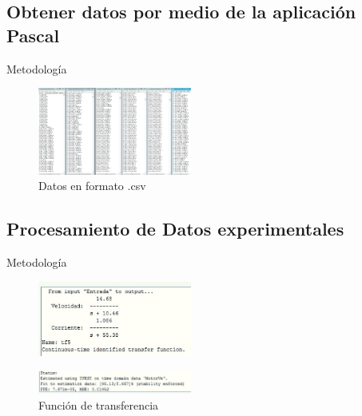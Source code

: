 \documentclass[mathserif,spanish]{beamer}
\begin{document}
    \subsection{Obtener datos por medio de la aplicación Pascal}
        \begin{frame}{Metodología}
              \item 
                 
        \begin{figure}[!h]
\centering
\includegraphics[width=0.45\textwidth]{Img04.png}
\caption{Datos en formato .csv}
\label{fig:rlocus1}
\end{figure}
        
      \end{frame}


    \subsection{Procesamiento de Datos experimentales}
        \begin{frame}{Metodología}
             \item 
                 
        \begin{figure}[!h]
\centering
\includegraphics[width=0.45\textwidth]{img02.jpeg}

\label{fig:rlocus1}
\end{figure}

        \begin{figure}[!h]
\centering
\includegraphics[width=0.45\textwidth]{img01.jpeg}
\caption{Función de transferencia}
\label{fig:rlocus1}
\end{figure}
        
            \end{frame}
\end{document}
